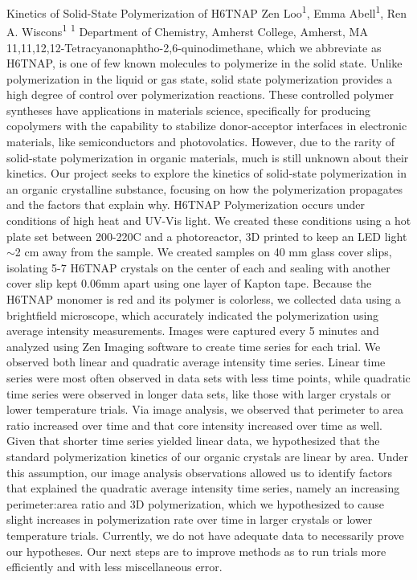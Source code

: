 \makeabstract
    {
    Kinetics of Solid-State Polymerization of H6TNAP
    }
    {
    Zen Loo\textsuperscript{1}, Emma Abell\textsuperscript{1}, Ren A. Wiscons\textsuperscript{1}
    }
    {
    \textsuperscript{1} Department of Chemistry, Amherst College, Amherst, MA
    }
    {
    11,11,12,12-Tetracyanonaphtho-2,6-quinodimethane, which we abbreviate as H6TNAP, is one of few known molecules to polymerize in the solid state. Unlike polymerization in the liquid or gas state, solid state polymerization provides a high degree of control over polymerization reactions. These controlled polymer syntheses have applications in materials science, specifically for producing copolymers with the capability to stabilize donor-acceptor interfaces in electronic materials, like semiconductors and photovolatics. However, due to the rarity of solid-state polymerization in organic materials, much is still unknown about their kinetics. Our project seeks to explore the kinetics of solid-state polymerization in an organic crystalline substance, focusing on how the polymerization propagates and the factors that explain why.
    }
    {
    H6TNAP Polymerization occurs under conditions of high heat and UV-Vis light. We created these conditions using a hot plate set between 200-220{\textordmasculine}C and a photoreactor, 3D printed to keep an LED light $\sim$2 cm away from the sample. We created samples on 40 mm glass cover slips, isolating 5-7 H6TNAP crystals on the center of each and sealing with another cover slip kept 0.06mm apart using one layer of Kapton tape. Because the H6TNAP monomer is red and its polymer is colorless, we collected data using a brightfield microscope, which accurately indicated the polymerization using average intensity measurements. Images were captured every 5 minutes and analyzed using Zen Imaging software to create time series for each trial.
    }
    {
    We observed both linear and quadratic average intensity time series. Linear time series were most often observed in data sets with less time points, while quadratic time series were observed in longer data sets, like those with larger crystals or lower temperature trials. Via image analysis, we observed that perimeter to area ratio increased over time and that core intensity increased over time as well.
    }
    {
    Given that shorter time series yielded linear data, we hypothesized that the standard polymerization kinetics of our organic crystals are linear by area. Under this assumption, our image analysis observations allowed us to identify factors that explained the quadratic average intensity time series, namely an increasing perimeter:area ratio and 3D polymerization, which we hypothesized to cause slight increases in polymerization rate over time in larger crystals or lower temperature trials. Currently, we do not have adequate data to necessarily prove our hypotheses. Our next steps are to improve methods as to run trials more efficiently and with less miscellaneous error.
    }

    \newpage
    